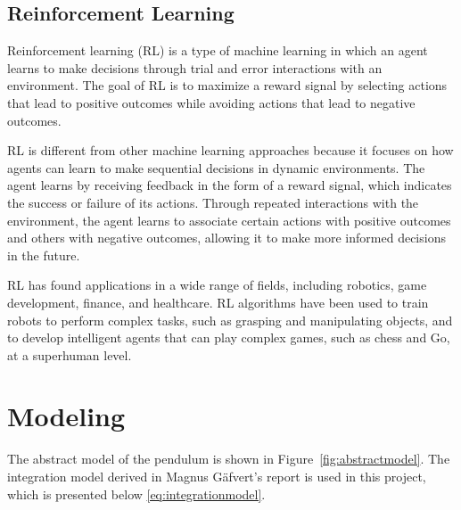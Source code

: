\documentclass{LTHtwocol} %
\begin{document}
\subsection{Reinforcement Learning}
Reinforcement learning (RL) is a type of machine learning in which an agent learns to make decisions through trial and error interactions with an environment. The goal of RL is to maximize a reward signal by selecting actions that lead to positive outcomes while avoiding actions that lead to negative outcomes.

RL is different from other machine learning approaches because it focuses on how agents can learn to make sequential decisions in dynamic environments. The agent learns by receiving feedback in the form of a reward signal, which indicates the success or failure of its actions. Through repeated interactions with the environment, the agent learns to associate certain actions with positive outcomes and others with negative outcomes, allowing it to make more informed decisions in the future.

RL has found applications in a wide range of fields, including robotics, game development, finance, and healthcare. RL algorithms have been used to train robots to perform complex tasks, such as grasping and manipulating objects, and to develop intelligent agents that can play complex games, such as chess and Go, at a superhuman level.

\section{Modeling}

The abstract model of the pendulum is shown in Figure~\ref{fig:abstractmodel}. The integration model derived in Magnus Gäfvert's report \cite{2efe5c5060d9449683ba4bc412e9acef} is used in this project, which is presented below \eqref{eq:integrationmodel}.
\end{document}
